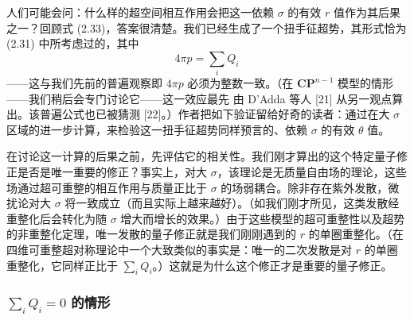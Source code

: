 
人们可能会问：什么样的超空间相互作用会把这一依赖 $\sigma$ 的有效 $r$ 值作为其后果之一？回顾式 (2.33)，答案很清楚。我们已经生成了一个扭手征超势，其形式恰为 (2.31) 中所考虑过的，其中
\begin{equation}\tag{3.13}
4\pi p=\sum_iQ_i
\end{equation}
——这与我们先前的普遍观察即 $4\pi p$ 必须为整数一致。（在 $\mathbf{CP}^{n-1}$ 模型的情形——我们稍后会专门讨论它——这一效应最先
\label{op:23}
由 D'Adda 等人 [21] 从另一观点算出。该普遍公式也已被猜测 [22]。）作者把如下验证留给好奇的读者：通过在大 $\sigma$ 区域的进一步计算，来检验这一扭手征超势同样预言的、依赖 $\sigma$ 的有效 $\theta$ 值。


在讨论这一计算的后果之前，先评估它的相关性。我们刚才算出的这个特定量子修正是否是唯一重要的修正？事实上，对大 $\sigma$，该理论是无质量自由场的理论，这些场通过超可重整的相互作用与质量正比于 $\sigma$ 的场弱耦合。除非存在紫外发散，微扰论对大 $\sigma$ 将一致成立（而且实际上越来越好）。（如我们刚才所见，这类发散经重整化后会转化为随 $\sigma$ 增大而增长的效果。）由于这些模型的超可重整性以及超势的非重整化定理，唯一发散的量子修正就是我们刚刚遇到的 $r$ 的单圈重整化。（在四维可重整超对称理论中一个大致类似的事实是：唯一的二次发散是对 $r$ 的单圈重整化，它同样正比于 $\sum_iQ_i$。）这就是为什么这个修正才是重要的量子修正。

\subsubsection*{$\sum_iQ_i=0$ 的情形}

